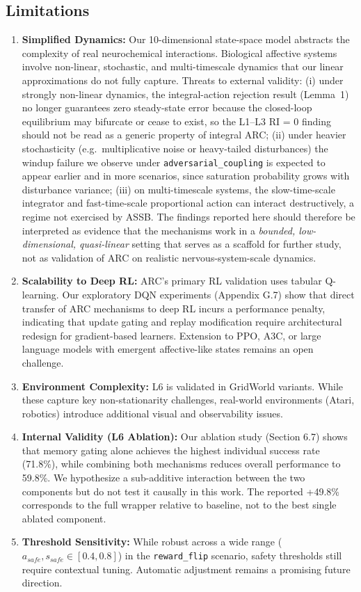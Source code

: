 \documentclass{article}
\begin{document}
\subsection{Limitations}

\begin{enumerate}
    \item \textbf{Simplified Dynamics:} Our 10-dimensional state-space model abstracts the complexity of real neurochemical interactions. Biological affective systems involve non-linear, stochastic, and multi-timescale dynamics that our linear approximations do not fully capture. Threats to external validity: (i) under strongly non-linear dynamics, the integral-action rejection result (Lemma~1) no longer guarantees zero steady-state error because the closed-loop equilibrium may bifurcate or cease to exist, so the L1--L3 RI = 0 finding should not be read as a generic property of integral ARC; (ii) under heavier stochasticity (e.g.\ multiplicative noise or heavy-tailed disturbances) the windup failure we observe under \texttt{adversarial\_coupling} is expected to appear earlier and in more scenarios, since saturation probability grows with disturbance variance; (iii) on multi-timescale systems, the slow-time-scale integrator and fast-time-scale proportional action can interact destructively, a regime not exercised by ASSB. The findings reported here should therefore be interpreted as evidence that the mechanisms work in a \emph{bounded, low-dimensional, quasi-linear} setting that serves as a scaffold for further study, not as validation of ARC on realistic nervous-system-scale dynamics.
    \item \textbf{Scalability to Deep RL:} ARC's primary RL validation uses tabular Q-learning. Our exploratory DQN experiments (Appendix G.7) show that direct transfer of ARC mechanisms to deep RL incurs a performance penalty, indicating that update gating and replay modification require architectural redesign for gradient-based learners. Extension to PPO, A3C, or large language models with emergent affective-like states remains an open challenge.
    \item \textbf{Environment Complexity:} L6 is validated in GridWorld variants. While these capture key non-stationarity challenges, real-world environments (Atari, robotics) introduce additional visual and observability issues.
    \item \textbf{Internal Validity (L6 Ablation):} Our ablation study (Section 6.7) shows that memory gating alone achieves the highest individual success rate (71.8\%), while combining both mechanisms reduces overall performance to 59.8\%. We hypothesize a sub-additive interaction between the two components but do not test it causally in this work. The reported +49.8\% corresponds to the full wrapper relative to baseline, not to the best single ablated component.
    \item \textbf{Threshold Sensitivity:} While robust across a wide range ($a_{safe}, s_{safe} \in [0.4, 0.8]$) in the \texttt{reward\_flip} scenario, safety thresholds still require contextual tuning. Automatic adjustment remains a promising future direction.
\end{enumerate}
\end{document}
